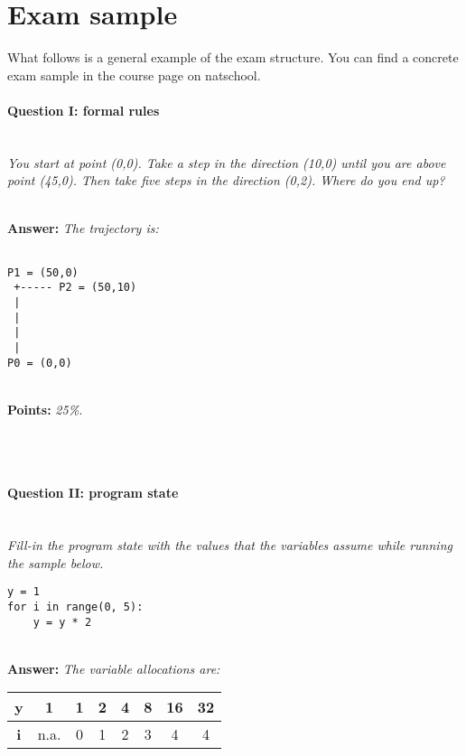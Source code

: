 \section*{Exam sample}
What follows is a general example of the exam structure. You can find a concrete exam sample in the course page on natschool.


\paragraph{Question I: formal rules} \ \\

\textit{You start at point (0,0). Take a step in the direction (10,0) until you are above point (45,0). Then take five steps in the direction (0,2). Where do you end up?}

\ \\ 

\textbf{Answer:} \textit{The trajectory is:}

\begin{lstlisting}

P1 = (50,0)
 +----- P2 = (50,10)
 |
 |
 |
 |
P0 = (0,0)
\end{lstlisting}

\ \\ 

\textbf{Points:} \textit{25\%.}

\ \\ 
\ \\ 

\paragraph{Question II: program state} \ \\ 

\textit{Fill-in the program state with the values that the variables assume while running the sample below.}

\begin{lstlisting}
y = 1
for i in range(0, 5):
    y = y * 2
\end{lstlisting}

\ \\ 

\textbf{Answer:} \textit{The variable allocations are:}

\begin{tabular}{| c | c | c | c | c | c | c | c |}
\hline
\textbf{y} & 1 & 1 & 2 & 4 & 8 & 16 & 32 \\
\hline
\textbf{i} & n.a. & 0 & 1 & 2 & 3 & 4 & 4 \\
\hline
\end{tabular}

